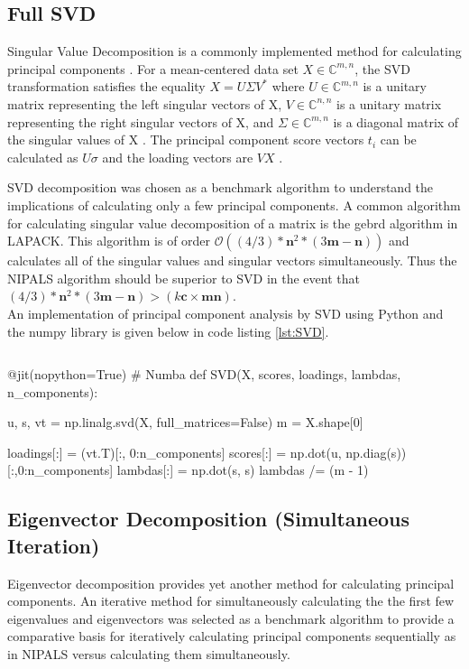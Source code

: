 \documentclass[12pt]{article}
\begin{document}
\subsection{Full SVD}\label{3.2}
Singular Value Decomposition is a commonly implemented method for calculating principal components \cite{oliphant2009numpy} \cite{scikit-learn}. For a mean-centered data set $X \in \mathbb{C}^{m,n}$, the SVD transformation satisfies the equality $X=U \Sigma V^*$ where
$ U\in \mathbb{C}^{m,n}$ is a unitary matrix representing the left singular vectors of X, $ V\in \mathbb{C}^{n,n}$ is a unitary matrix representing the right singular vectors of X, and $\Sigma \in \mathbb{C}^{m,n}$ is a diagonal matrix of the singular values of X \cite{trefethen1997numerical}. The principal component score vectors $t_i$ can be calculated as $U \sigma $ and the loading vectors are $VX$ \cite{madsen2004singular}. 

SVD decomposition was chosen as a benchmark algorithm to understand the implications of calculating only a few principal components. A common algorithm for calculating singular value decomposition of a matrix is the gebrd algorithm in LAPACK. This algorithm is of order $\mathcal{O}( (4/3)*\textbf{n}^2*(3\textbf{m} - \textbf{n}) )$ \cite{intelmath} and calculates all of the singular values and singular vectors simultaneously. Thus the NIPALS algorithm should be superior to SVD in the event that $(4/3)*\textbf{n}^2*(3\textbf{m} - \textbf{n})>(k\textbf{c}\times\textbf{mn})$.  \\ An implementation of principal component analysis by SVD using Python and the numpy library is given below in code listing \ref{lst:SVD}.

\begin{lstlisting}[frame=none,caption={Calculating Principal Components with SVD},captionpos=b,label=lst:SVD]
\end{lstlisting}

\begin{python}
@jit(nopython=True) # Numba
def SVD(X, scores, loadings, lambdas, n_components):

    u, s, vt = np.linalg.svd(X, full_matrices=False)
    m = X.shape[0]

    loadings[:] = (vt.T)[:, 0:n_components]
    scores[:] = np.dot(u, np.diag(s))[:,0:n_components]
    lambdas[:] = np.dot(s, s)
    lambdas /= (m - 1)
\end{python}


\subsection{Eigenvector Decomposition (Simultaneous Iteration)}\label{3.3}
Eigenvector decomposition provides yet another method for calculating principal components. An iterative method for simultaneously calculating the the first few eigenvalues and eigenvectors was selected as a benchmark algorithm to provide a comparative basis for iteratively calculating principal components sequentially as in NIPALS versus calculating them simultaneously. 
\end{document}
